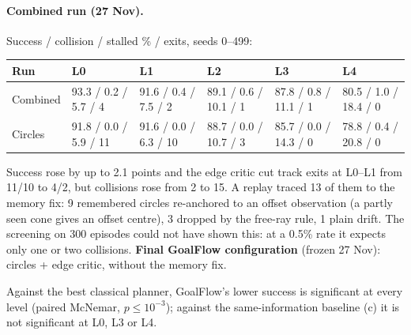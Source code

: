 \documentclass[11pt,a4paper]{article}
\begin{document}
\paragraph{Combined run (27 Nov).} Success / collision / stalled \% / exits, seeds 0--499:
\begin{table}[H]
\scriptsize\setlength{\tabcolsep}{4pt}
\begin{tabular}{@{}llllll@{}}
\toprule
Run & L0 & L1 & L2 & L3 & L4 \\
\midrule
Combined & 93.3 / 0.2 / 5.7 / 4 & 91.6 / 0.4 / 7.5 / 2 & 89.1 / 0.6 / 10.1 / 1 & 87.8 / 0.8 / 11.1 / 1 & 80.5 / 1.0 / 18.4 / 0 \\
Circles & 91.8 / 0.0 / 5.9 / 11 & 91.6 / 0.0 / 6.3 / 10 & 88.7 / 0.0 / 10.7 / 3 & 85.7 / 0.0 / 14.3 / 0 & 78.8 / 0.4 / 20.8 / 0 \\
\bottomrule
\end{tabular}
\end{table}
Success rose by up to 2.1 points and the edge critic cut track exits at L0--L1 from 11/10 to 4/2, but collisions rose
from 2 to 15. A replay traced 13 of them to the memory fix: 9 remembered circles re-anchored to an offset observation
(a partly seen cone gives an offset centre), 3 dropped by the free-ray rule, 1 plain drift. The screening on 300
episodes could not have shown this: at a 0.5\% rate it expects only one or two collisions. \textbf{Final GoalFlow
configuration} (frozen 27 Nov): circles + edge critic, without the memory fix.

Against the best classical planner, GoalFlow's lower success is significant at every level (paired McNemar,
$p\le10^{-3}$); against the same-information baseline (c) it is not significant at L0, L3 or L4.
\end{document}
